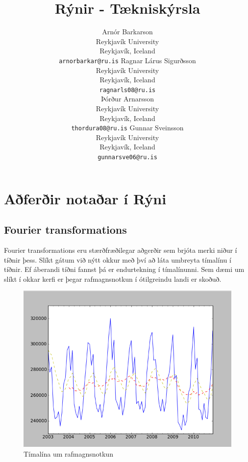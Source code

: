 \documentclass[11pt]{article}
\title{Rýnir - Tækniskýrsla}
\author{Arnór Barkarson\\
  Reykjavík University\\
  Reykjavík, Iceland\\
  {\tt arnorbarkar@ru.is}  \And  
  Ragnar Lárus Sigurðsson\\
  Reykjavík University\\
  Reykjavík, Iceland\\
  {\tt  ragnarls08@ru.is}\\ \And 
  Þórður Arnarsson\\
  Reykjavík University\\
  Reykjavík, Iceland\\
  {\tt  thordura08@ru.is}  \And 
  Gunnar Sveinsson\\
  Reykjavík University\\
  Reykjavík, Iceland\\
  {\tt  gunnarsve06@ru.is} 
}
\date{}
\begin{document}
\maketitle

\section{Aðferðir notaðar í Rýni}
\subsection{Fourier transformations}
Fourier transformations eru stærðfræðilegar aðgerðir sem brjóta merki niður í tíðnir þess. Slíkt gátum við nýtt okkur með því að láta umbreyta 
tímalínu í tíðnir. Ef áberandi tíðni fannst þá er endurtekning í tímalínunni. Sem dæmi um slíkt í okkar kerfi er þegar 
rafmagnsnotkun í ótilgreindu landi er skoðuð.\\
\begin{figure}
 \begin{center}
 \includegraphics[width=.45\textwidth]{Rafmagnsnotkun.png}
 \caption{Tímalína um rafmagnsnotkun}
  \end{center}
\end{figure}
\hfill
\\\\\\\\\\\\\\\\\\\\\\\\\\\\\\\
\end{document}
